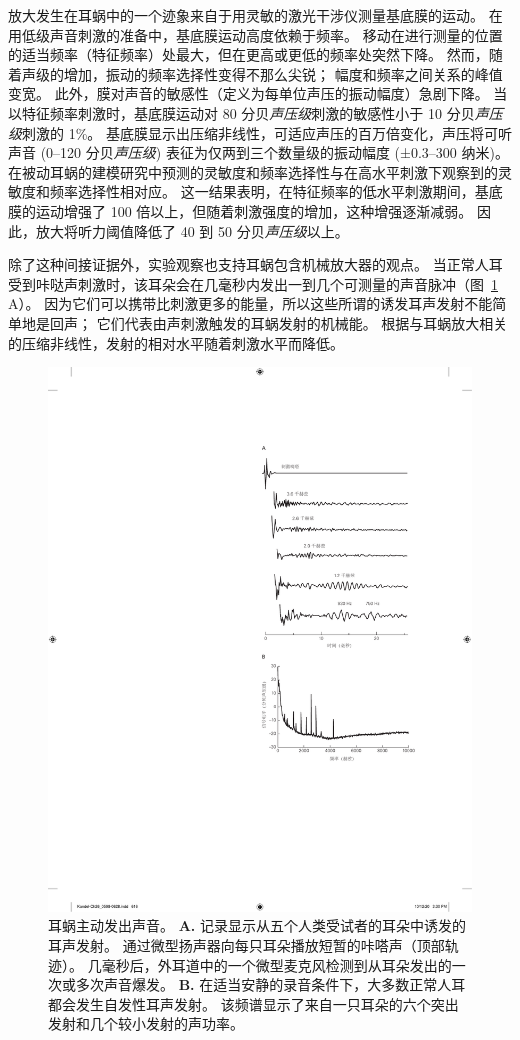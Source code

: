 放大发生在耳蜗中的一个迹象来自于用灵敏的激光干涉仪测量基底膜的运动。
在用低级声音刺激的准备中，基底膜运动高度依赖于频率。
移动在进行测量的位置的适当频率（特征频率）处最大，但在更高或更低的频率处突然下降。
然而，随着声级的增加，振动的频率选择性变得不那么尖锐；
幅度和频率之间关系的峰值变宽。
此外，膜对声音的敏感性（定义为每单位声压的振动幅度）急剧下降。
当以特征频率刺激时，基底膜运动对 80 分贝\textit{声压级}刺激的敏感性小于 10 分贝\textit{声压级}刺激的 1\%。
基底膜显示出压缩非线性，可适应声压的百万倍变化，声压将可听声音 (0–120 分贝\textit{声压级}) 表征为仅两到三个数量级的振动幅度 (±0.3–300 纳米)。
在被动耳蜗的建模研究中预测的灵敏度和频率选择性与在高水平刺激下观察到的灵敏度和频率选择性相对应。
这一结果表明，在特征频率的低水平刺激期间，基底膜的运动增强了 100 倍以上，但随着刺激强度的增加，这种增强逐渐减弱。
因此，放大将听力阈值降低了 40 到 50 分贝\textit{声压级}以上。


除了这种间接证据外，实验观察也支持耳蜗包含机械放大器的观点。
当正常人耳受到咔哒声刺激时，该耳朵会在几毫秒内发出一到几个可测量的声音脉冲（图~\ref{fig:26_13} A）。
因为它们可以携带比刺激更多的能量，所以这些所谓的诱发耳声发射不能简单地是回声；
它们代表由声刺激触发的耳蜗发射的机械能。
根据与耳蜗放大相关的压缩非线性，发射的相对水平随着刺激水平而降低。


\begin{figure}[htbp]
	\centering
	\includegraphics[width=0.65\linewidth]{chap26/fig_26_13}
	\caption{耳蜗主动发出声音。
		\textbf{A.} 记录显示从五个人类受试者的耳朵中诱发的耳声发射。
		通过微型扬声器向每只耳朵播放短暂的咔嗒声（顶部轨迹）。
		几毫秒后，外耳道中的一个微型麦克风检测到从耳朵发出的一次或多次声音爆发\cite{wilson1980evidence}。
		\textbf{B.} 在适当安静的录音条件下，大多数正常人耳都会发生自发性耳声发射。
		该频谱显示了来自一只耳朵的六个突出发射和几个较小发射的声功率\cite{murphy1995relaxation}。}
	\label{fig:26_13}
\end{figure}


